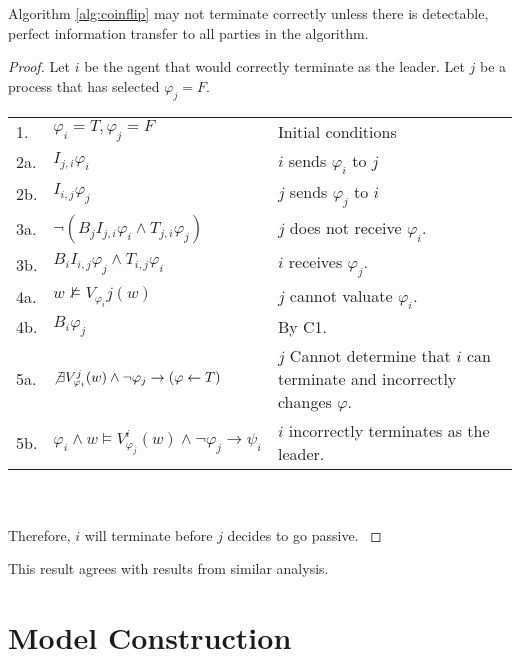\begin{thm}
Algorithm \ref{alg:coinflip} may not terminate correctly unless there is detectable, perfect information transfer to all parties in the algorithm.
\end{thm}

\begin{proof}
Let $i$ be the agent that would correctly terminate as the leader. Let $j$ be a process that has selected $\varphi_j = F$.

\begin{table}[H]
\centering
\small
\begin{tabularx}{\linewidth}{l X X}
1. & $\varphi_i = T, \varphi_j = F$ & Initial conditions \\
2a.& $I_{j,i} \varphi_i$ & $i$ sends $\varphi_i$ to $j$ \\
2b.& $I_{i,j} \varphi_j$ & $j$ sends $\varphi_j$ to $i$ \\
3a.& $\neg (B_j I_{j,i} \varphi_i \wedge T_{j,i} \varphi_j)$ & $j$ does not receive $\varphi_i$. \\
3b.& $B_i I_{i,j} \varphi_j \wedge T_{i,j} \varphi_i$ & $i$ receives $\varphi_j$. \\
4a.& $w \not \vDash V_{\varphi_i}{j}(w)$ & $j$ cannot valuate $\varphi_i$. \\
4b.& $B_i \varphi_j$ & By C1. \\
5a. & $\not \exists V_{\varphi_i}^j(w) \wedge \neg \varphi_j \rightarrow (\varphi \gets T)$ & $j$ Cannot determine that $i$ can terminate and incorrectly changes $\varphi$. \\
5b. & $\varphi_i \wedge w \vDash V_{\varphi_j}^i(w) \wedge \neg \varphi_j \rightarrow \psi_i$ & $i$ incorrectly terminates as the leader. \\

\end{tabularx} \\~\\
Therefore, $i$ will terminate before $j$ decides to go passive.
\label{tab:anonymityproof}
\end{table}
\end{proof}

This result agrees with results from similar analysis\cite{anon-omission}.

\section{Model Construction}

